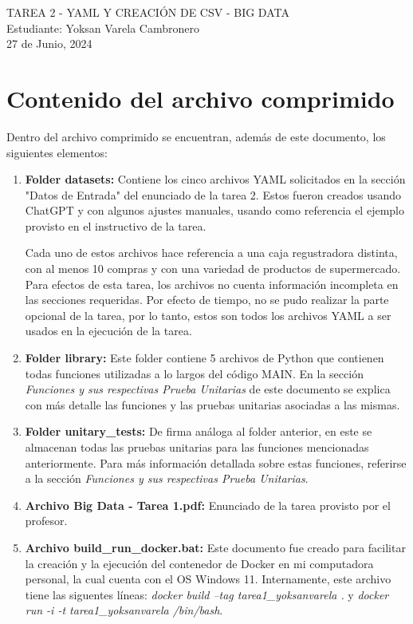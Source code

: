 \documentclass[a4paper]{article}
\begin{document}
\begin{center}
\large{TAREA 2 - YAML Y CREACI\'{O}N DE CSV - BIG DATA}\\
\small{Estudiante: Yoksan Varela Cambronero}\\
\small{27 de Junio, 2024}
\end{center}

\section{Contenido del archivo comprimido}
Dentro del archivo comprimido se encuentran, adem\'{a}s de este documento, los siguientes elementos:
\begin{enumerate}
    \item \textbf{Folder datasets:} Contiene los cinco archivos YAML solicitados en la secci\'{o}n "Datos de Entrada" del enunciado de la tarea 2. Estos fueron creados usando ChatGPT y con algunos ajustes manuales, usando como referencia el ejemplo provisto en el instructivo de la tarea.

    Cada uno de estos archivos hace referencia a una caja regustradora distinta, con al menos 10 compras y con una variedad de productos de supermercado. Para efectos de esta tarea, los archivos no cuenta informaci\'{o}n incompleta en las secciones requeridas. Por efecto de tiempo, no se pudo realizar la parte opcional de la tarea, por lo tanto, estos son todos los archivos YAML a ser usados en la ejecuci\'{o}n de la tarea.
    
    \item \textbf{Folder library:} Este folder contiene 5 archivos de Python que contienen todas funciones utilizadas a lo largos del c\'{o}digo MAIN. En la secci\'{o}n \textit{Funciones y sus respectivas Prueba Unitarias} de este documento se explica con m\'{a}s detalle las funciones y las pruebas unitarias asociadas a las mismas. 
    
    \item \textbf{Folder unitary\_tests:} De firma an\'{a}loga al folder anterior, en este se almacenan todas las pruebas unitarias para las funciones mencionadas anteriormente. Para m\'{a}s informaci\'{o}n detallada sobre estas funciones, referirse a la secci\'{o}n \textit{Funciones y sus respectivas Prueba Unitarias}.
    
    \item \textbf{Archivo Big Data - Tarea 1.pdf:} Enunciado de la tarea provisto por el profesor.
    
    \item \textbf{Archivo build\_run\_docker.bat:} Este documento fue creado para facilitar la creaci\'{o}n y la ejecuci\'{o}n del contenedor de Docker en mi computadora personal, la cual cuenta con el OS Windows 11. Internamente, este archivo tiene las siguentes l\'{i}neas: \textit{ docker build --tag tarea1\_yoksanvarela .} y \textit{ docker run -i -t tarea1\_yoksanvarela /bin/bash}.
    

\end{enumerate}
\end{document}
